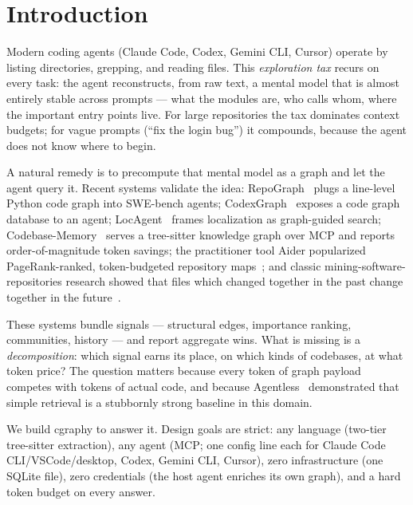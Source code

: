 \documentclass[11pt]{article}
\begin{document}
\section{Introduction}
Modern coding agents (Claude Code, Codex, Gemini CLI, Cursor) operate by
listing directories, grepping, and reading files. This \emph{exploration
tax} recurs on every task: the agent reconstructs, from raw text, a mental
model that is almost entirely stable across prompts --- what the modules
are, who calls whom, where the important entry points live. For large
repositories the tax dominates context budgets; for vague prompts
(``fix the login bug'') it compounds, because the agent does not know where
to begin.

A natural remedy is to precompute that mental model as a graph and let the
agent query it. Recent systems validate the idea: RepoGraph~\cite{repograph}
plugs a line-level Python code graph into SWE-bench agents;
CodexGraph~\cite{codexgraph} exposes a code graph database to an agent;
LocAgent~\cite{locagent} frames localization as graph-guided search;
Codebase-Memory~\cite{codebasememory} serves a tree-sitter knowledge graph
over MCP and reports order-of-magnitude token savings; the practitioner
tool Aider popularized PageRank-ranked, token-budgeted repository
maps~\cite{aider}; and classic mining-software-repositories research showed
that files which changed together in the past change together in the
future~\cite{gall,zimmermann}.

These systems bundle signals --- structural edges, importance ranking,
communities, history --- and report aggregate wins. What is missing is a
\emph{decomposition}: which signal earns its place, on which kinds of
codebases, at what token price? The question matters because every token of
graph payload competes with tokens of actual code, and because
Agentless~\cite{agentless} demonstrated that simple retrieval is a
stubbornly strong baseline in this domain.

We build cgraphy to answer it. Design goals are strict: any language
(two-tier tree-sitter extraction), any agent (MCP; one config line each for
Claude Code CLI/VSCode/desktop, Codex, Gemini CLI, Cursor), zero
infrastructure (one SQLite file), zero credentials (the host agent enriches
its own graph), and a hard token budget on every answer.
\end{document}
